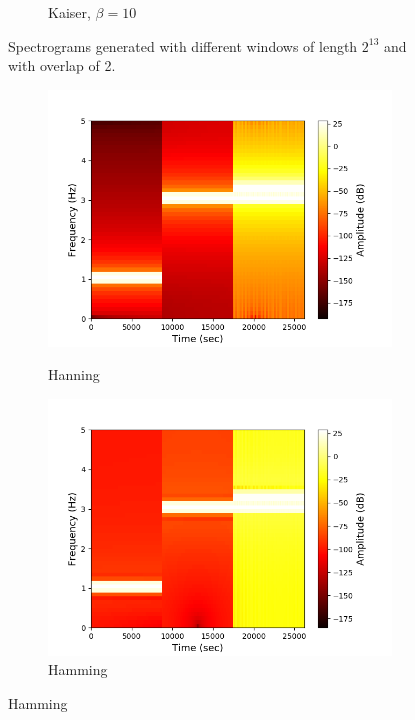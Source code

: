 \begin{figure}[H]
\begin{subfigure}{0.49\textwidth}
\caption{Kaiser, $\beta=10$}
\label{fig:stft_kaiser_10000_10}
\end{subfigure}
\caption{Spectrograms generated with different windows of length $2^{13}$ and with overlap of 2.}
\label{fig:stft_windows_10000}
\end{figure}
\begin{figure}[H]
\centering
\begin{subfigure}{0.49\textwidth}
\centering
\includegraphics[width=\textwidth]{figures/stft_windows/100/hanning.png}
\caption{Hanning}
\label{fig:stft_hanning_100}
\includegraphics[width=\textwidth]{figures/stft_windows/100/hamming.png}
\caption{Hamming}
\label{fig:stft_hamming_100}

\end{subfigure}
\end{figure}

